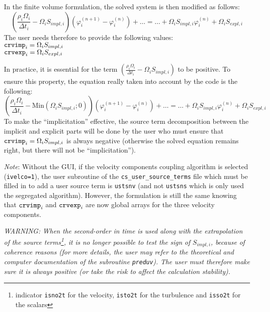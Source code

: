 {{{In the finite volume formulation, the solved system is then modified as
follows:
\begin{displaymath}
\left(\frac{\rho_i\Omega_i}{\Delta t_i}-\Omega_iS_{impl,i}\right)
\left(\varphi_i^{(n+1)}-\varphi_i^{(n)}\right)
+\ldots = \ldots + \Omega_iS_{impl,i}\varphi_i^{(n)} + \Omega_iS_{expl,i}
\end{displaymath}
The user needs therefore to provide the following values:\\
$\text{\texttt{crvimp}}_i=\Omega_iS_{impl,i}$\\
$\text{\texttt{crvexp}}_i=\Omega_iS_{expl,i}$

In practice, it is essential for the term
$\displaystyle \left(\frac{\rho_i\Omega_i}{\Delta
t_i}-\Omega_iS_{impl,i}\right)$ to be positive. To ensure this property,
the equation really taken into account by the code is the following:
\begin{displaymath}
\left(\frac{\rho_i\Omega_i}{\Delta t_i}-
\text{Min}(\Omega_iS_{impl,i};0)\right)
\left(\varphi_i^{(n+1)}-\varphi_i^{(n)}\right)
+\ldots = \ldots + \Omega_iS_{impl,i}\varphi_i^{(n)} + \Omega_iS_{expl,i}
\end{displaymath}
To make the ``implicitation'' effective, the source term decomposition
between the implicit and explicit parts will be done by the user who must
ensure that $\text{\texttt{crvimp}}_i=\Omega_iS_{impl,i}$ is always negative
(otherwise the solved equation remains right, but there will not be
``implicitation'').

{\em Note}: Without the GUI, if the velocity components coupling algorithm is selected (\texttt{ivelco=1}), the user subroutine of
the \texttt{cs\_user\_source\_terms} file which must be filled in to add a user source term is \texttt{ustsnv} (and not \texttt{ustsns} 
which is only used the segregated algorithm). However, the formulation is still the same knowing that $\text{\texttt{crvimp}}_i$ and 
$\text{\texttt{crvexp}}_i$ are now global arrays for the three velocity components. 

{\em WARNING: When the second-order in time is used along with the extrapolation of the
source terms\footnote{indicator \texttt{isno2t} for the velocity,
\texttt{isto2t} for the turbulence and \texttt{isso2t} for the scalars}, it is no longer possible to test the sign of $S_{impl,i}$,
because of coherence reasons (for more details, the user may refer to
the theoretical and computer documentation \cite{theory} of the
subroutine \texttt{preduv}). The user must therefore make sure it is
always positive (or take the risk to affect the calculation stability).}

}}}
